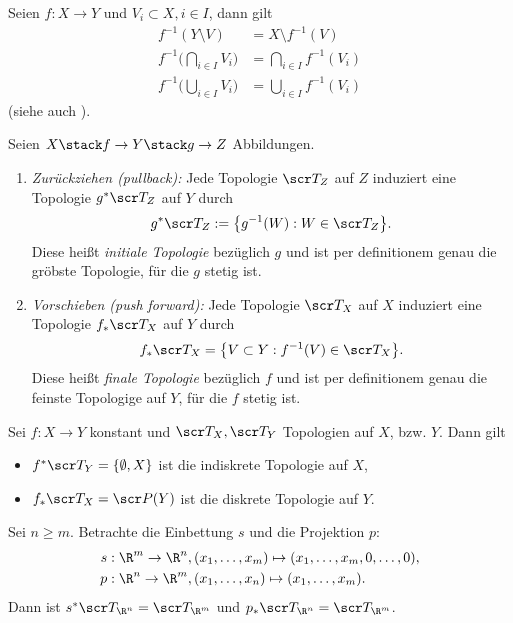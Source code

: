 Seien $f: X \to Y$ und $V_i \subset X, i \in I$, dann gilt
\begin{align*}
	f^{-1}(Y \setminus V) &= X \setminus f^{-1}(V) \\
	f^{-1}\Big(\bigcap_{i\in I} V_i\Big) &= \bigcap_{i\in I} f^{-1}(V_i) \\
	f^{-1}\Big(\bigcup_{i\in I} V_i\Big) &= \bigcup_{i\in I} f^{-1}(V_i)
\end{align*}
(siehe auch ).
\begin{df}
	Seien $X \stack f\to Y \stack g\to Z$ Abbildungen.
	\begin{enumerate}[(1)]
		\item
			\emph{Zurückziehen (pullback):}
			Jede Topologie $\scr T_Z$ auf $Z$ induziert eine Topologie $g^*\scr T_Z$ auf $Y$ durch
			\[
				g^* \scr T_Z
				:= \big\{ g^{-1}(W) : W \in \scr T_Z \big\}.
			\]
			Diese heißt \emph{initiale Topologie} bezüglich $g$ und ist per definitionem genau die gröbste Topologie, für die $g$ stetig ist.
		\item
			\emph{Vorschieben (push forward):}
			Jede Topologie $\scr T_X$ auf $X$ induziert eine Topologie $f_* \scr T_X$ auf $Y$ durch
			\[
				f_* \scr T_X = \big\{ V \subset Y : f^{-1}(V) \in \scr T_X \big\}.
			\]
			Diese heißt \emph{finale Topologie} bezüglich $f$ und ist per definitionem genau die feinste Topologige auf $Y$, für die $f$ stetig ist.
	\end{enumerate}
\end{df}

\begin{ex}
	Sei $f: X \to Y$ konstant und $\scr T_X, \scr T_Y$ Topologien auf $X$, bzw. $Y$.
	Dann gilt
	\begin{itemize}
		\item
			$f^* \scr T_Y = \{ \emptyset, X \}$ ist die indiskrete Topologie auf $X$,
		\item
			$f_* \scr T_X = \scr P(Y)$ ist die diskrete Topologie auf $Y$.
	\end{itemize}
\end{ex}

\begin{ex}
	Sei $n \ge m$.
	Betrachte die Einbettung $s$ und die Projektion $p$:
	\begin{align*}
		s&: \R^m \to \R^n, (x_1,\dotsc, x_m) \mapsto (x_1, \dotsc, x_m, 0, \dotsc, 0), \\
		p&: \R^n \to \R^m, (x_1,\dotsc, x_n) \mapsto (x_1, \dotsc, x_m).
	\end{align*}
	Dann ist $s^* \scr T_{\R^n} = \scr T_{\R^m}$ und $p_* \scr T_{\R^n} = \scr T_{\R^m}$.
\end{ex}

